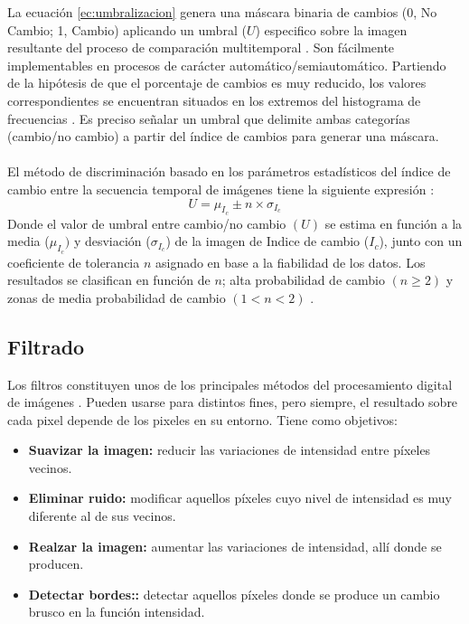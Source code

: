 La ecuaci\'on \ref{ec:umbralizacion} genera una m\'ascara binaria de cambios (0, No Cambio; 1, Cambio) aplicando un umbral ($ U $) especifico sobre la imagen resultante del proceso de comparaci\'on multitemporal \cite{singh1989review}. Son f\'acilmente implementables en procesos de car\'acter autom\'atico/semiautom\'atico. Partiendo de la hip\'otesis de que el porcentaje de cambios es muy reducido, los valores correspondientes se encuentran situados en los extremos del histograma de frecuencias \cite{estornell2004analisis}. Es preciso se\~{n}alar un umbral que delimite ambas categorías (cambio/no cambio) a partir del \'indice de cambios \cite{radke2005image} para generar una m\'ascara.\\~\\
El m\'etodo de discriminaci\'on basado en los par\'ametros estad\'isticos del \'indice de cambio entre la secuencia temporal de im\'agenes tiene la siguiente expresi\'on \cite{rodriguez2010analisis}:
\begin{equation}
U=\mu_{I_{c}} \pm n \times \sigma _{I_{c}}
\end{equation}
Donde el valor de umbral entre cambio/no cambio $ (U) $ se estima en funci\'on a la media ($ \mu_{I_{c}}) $ y desviaci\'on ($ \sigma_{I_{c}} $) de la imagen de Indice de cambio ($ I_{c} $), junto con un coeficiente de tolerancia $ n $ asignado en base a la fiabilidad de los datos. Los resultados se clasifican en funci\'on de $ n $; alta probabilidad de cambio $ (n \geq 2) $ y
zonas de media probabilidad de cambio $ (1 < n < 2) $ \cite{estornell2004analisis}.

\subsection{Filtrado}
Los filtros constituyen unos de los principales m\'etodos del procesamiento digital de im\'agenes . Pueden usarse para distintos fines, pero siempre, el resultado sobre cada pixel depende de los pixeles en su entorno. Tiene como objetivos: 
	\begin{itemize}
		\item \textbf{Suavizar la imagen:} reducir las variaciones de intensidad entre p\'ixeles vecinos.
		\item \textbf{Eliminar ruido:}  modificar aquellos p\'ixeles cuyo nivel de intensidad es muy diferente al de sus vecinos.
		\item \textbf{Realzar la imagen:} aumentar las variaciones de intensidad, all\'i donde se producen.
		\item \textbf{Detectar bordes::} detectar aquellos p\'ixeles donde se produce un cambio brusco en la funci\'on intensidad.	
	\end{itemize}


